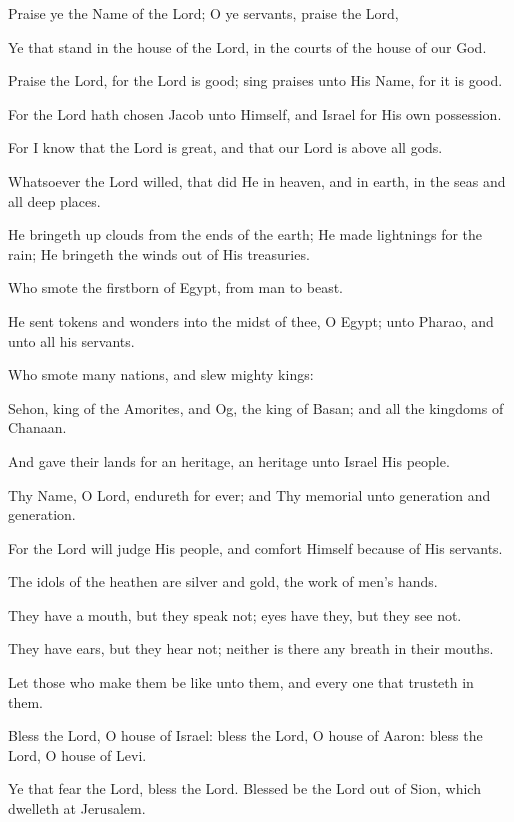 Praise ye the Name of the Lord; O ye servants, praise the Lord,

Ye that stand in the house of the Lord, in the courts of the house of our God.

Praise the Lord, for the Lord is good; sing praises unto His Name, for it is good.

For the Lord hath chosen Jacob unto Himself, and Israel for His own possession.

For I know that the Lord is great, and that our Lord is above all gods.

Whatsoever the Lord willed, that did He in heaven, and in earth, in the seas and all deep places.

He bringeth up clouds from the ends of the earth; He made lightnings for the rain; He bringeth the winds out of His treasuries.

Who smote the firstborn of Egypt, from man to beast.

He sent tokens and wonders into the midst of thee, O Egypt; unto Pharao, and unto all his servants.

Who smote many nations, and slew mighty kings:

Sehon, king of the Amorites, and Og, the king of Basan; and all the kingdoms of Chanaan.

And gave their lands for an heritage, an heritage unto Israel His people.

Thy Name, O Lord, endureth for ever; and Thy memorial unto generation and generation.

For the Lord will judge His people, and comfort Himself because of His servants.

The idols of the heathen are silver and gold, the work of men's hands.

They have a mouth, but they speak not; eyes have they, but they see not.

They have ears, but they hear not; neither is there any breath in their mouths.

Let those who make them be like unto them, and every one that trusteth in them.

Bless the Lord, O house of Israel: bless the Lord, O house of Aaron: bless the Lord, O house of Levi.

Ye that fear the Lord, bless the Lord. Blessed be the Lord out of Sion, which dwelleth at Jerusalem.
